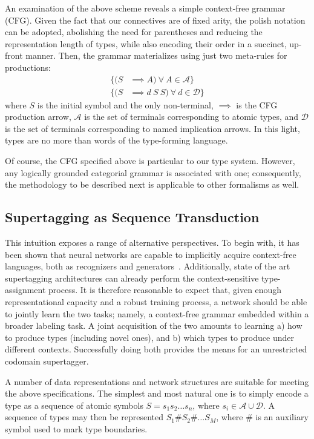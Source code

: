 An examination of the above scheme reveals a simple context-free grammar (CFG).
Given the fact that our connectives are of fixed arity, the polish notation~\cite{hamblin1962translation} can be adopted, abolishing the need for parentheses and reducing the representation length of types, while also encoding their order in a succinct, up-front manner.
Then, the grammar materializes using just two meta-rules for productions:
\begin{align}
\{ (S & \implies A) \  \forall \ A \in \mathcal{A} \}
\\
\{(S & \implies d \ S \ S) \ \forall \ d \in \mathcal{D} \}
\label{eqn:cfg}
\end{align}
where $S$ is the initial symbol and the only non-terminal, $\implies$ is the CFG production arrow, $\mathcal{A}$ is the set of terminals corresponding to atomic types, and $\mathcal{D}$ is the set of terminals corresponding to named implication arrows.
In this light, types are no more than words of the type-forming language.

Of course, the CFG specified above is particular to our type system.
However, any logically grounded categorial grammar is associated with one; consequently, the methodology to be described next is applicable to other formalisms as well. 

\subsection{Supertagging as Sequence Transduction}
This intuition exposes a range of alternative perspectives.
To begin with, it has been shown that neural networks are capable to implicitly acquire context-free languages, both as recognizers and generators~\cite{noPhysics}.
Additionally, state of the art supertagging architectures can already perform the context-sensitive type-assignment process.
It is therefore reasonable to expect that, given enough representational capacity and a robust training process, a network should be able to jointly learn the two tasks; namely, a context-free grammar embedded within a broader labeling task.
A joint acquisition of the two amounts to learning a) how to produce types (including novel ones), and b) which types to produce under different contexts.
Successfully doing both provides the means for an unrestricted codomain supertagger.

A number of data representations and network structures are suitable for meeting the above specifications.
The simplest and most natural one is to simply encode a type as a sequence of atomic symbols $S = s_1 s_2\dots s_n$, where $s_i \in \mathcal{A}\cup\mathcal{D}$.
A sequence of types may then be represented $S_1 \# S_2 \# \dots S_M$, where \# is an auxiliary symbol used to mark type boundaries.


